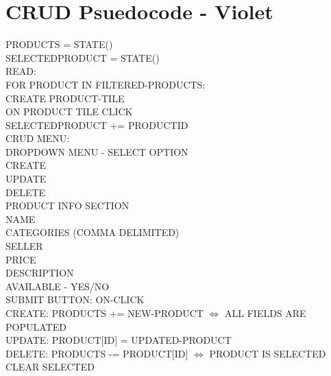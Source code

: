 \documentclass{article}[12pt]
\begin{document}
\section{CRUD Psuedocode - Violet}
\begin{minipage}{12cm}  %
\ttfamily
\setlength{\parindent}{20pt}
\noindent PRODUCTS = STATE() \\
\noindent SELECTEDPRODUCT = STATE() \\

\noindent READ: \\
    \indent FOR PRODUCT IN FILTERED-PRODUCTS: \\
    \indent \indent CREATE PRODUCT-TILE \\

\noindent ON PRODUCT TILE CLICK \\
    \indent SELECTEDPRODUCT += PRODUCTID \\

\noindent CRUD MENU: \\
    \indent DROPDOWN MENU - SELECT OPTION \\
        \indent \indent CREATE \\
        \indent \indent UPDATE \\
        \indent \indent DELETE \\
    \indent PRODUCT INFO SECTION \\
        \indent \indent NAME \\
        \indent \indent CATEGORIES (COMMA DELIMITED) \\
        \indent \indent SELLER \\
        \indent \indent PRICE \\
        \indent \indent DESCRIPTION \\
        \indent \indent AVAILABLE - YES/NO \\
    \indent SUBMIT BUTTON: ON-CLICK \\
        \indent \indent CREATE: PRODUCTS += NEW-PRODUCT $\iff$ ALL FIELDS ARE POPULATED \\  %
        \indent \indent UPDATE: PRODUCT[ID] = UPDATED-PRODUCT \\
        \indent \indent DELETE: PRODUCTS -= PRODUCT[ID] $\iff$ PRODUCT IS SELECTED \\
        \indent \indent CLEAR SELECTED \\
\end{minipage}
\end{document}
